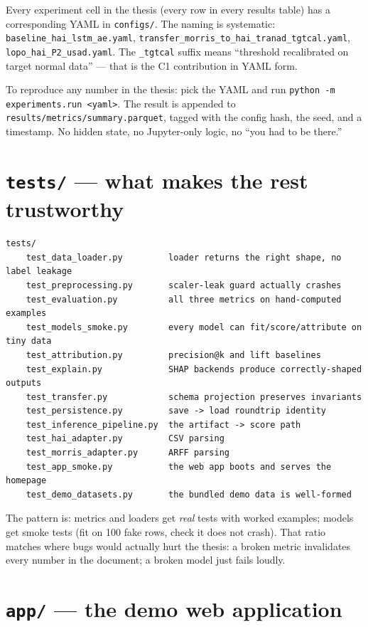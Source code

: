 \documentclass[11pt,a4paper]{article}
\newcommand{\code}[1]{\texttt{#1}}
\begin{document}
Every experiment cell in the thesis (every row in every results table) has a corresponding YAML in \code{configs/}. The naming is systematic: \code{baseline\_hai\_lstm\_ae.yaml}, \code{transfer\_morris\_to\_hai\_tranad\_tgtcal.yaml}, \code{lopo\_hai\_P2\_usad.yaml}. The \code{\_tgtcal} suffix means ``threshold recalibrated on target normal data'' --- that is the C1 contribution in YAML form.

To reproduce any number in the thesis: pick the YAML and run \code{python -m experiments.run <yaml>}. The result is appended to \code{results/metrics/summary.parquet}, tagged with the config hash, the seed, and a timestamp. No hidden state, no Jupyter-only logic, no ``you had to be there.''

\section{\texttt{tests/} --- what makes the rest trustworthy}

\begin{Verbatim}
tests/
    test_data_loader.py         loader returns the right shape, no label leakage
    test_preprocessing.py       scaler-leak guard actually crashes
    test_evaluation.py          all three metrics on hand-computed examples
    test_models_smoke.py        every model can fit/score/attribute on tiny data
    test_attribution.py         precision@k and lift baselines
    test_explain.py             SHAP backends produce correctly-shaped outputs
    test_transfer.py            schema projection preserves invariants
    test_persistence.py         save -> load roundtrip identity
    test_inference_pipeline.py  the artifact -> score path
    test_hai_adapter.py         CSV parsing
    test_morris_adapter.py      ARFF parsing
    test_app_smoke.py           the web app boots and serves the homepage
    test_demo_datasets.py       the bundled demo data is well-formed
\end{Verbatim}

The pattern is: metrics and loaders get \emph{real} tests with worked examples; models get smoke tests (fit on 100 fake rows, check it does not crash). That ratio matches where bugs would actually hurt the thesis: a broken metric invalidates every number in the document; a broken model just fails loudly.

\section{\texttt{app/} --- the demo web application}
\end{document}
